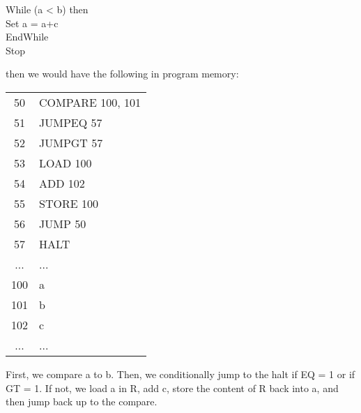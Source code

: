 \documentclass[]{article}
\begin{document}
\setlength{\parindent}{0.5cm}\noindent
While (a < b) then\\
\indent Set a = a+c\\
EndWhile\\
Stop\\
\setlength{\parindent}{0pt}

then we would have the following in program memory: \\

\begin{center}
	\begin{tabular}{c|l|}\cline{2-2}
		50 & COMPARE 100, 101 \\\cline{2-2}
		51 & JUMPEQ 57 \\\cline{2-2}
		52 & JUMPGT 57  \\\cline{2-2}
		53 & LOAD 100 \\\cline{2-2}
		54 & ADD 102 \\\cline{2-2}
		55 & STORE 100 \\\cline{2-2}
		56 & JUMP 50 \\\cline{2-2}
		57 & HALT \\\cline{2-2}
		... & ... \\\cline{2-2}
		100 & a \\\cline{2-2}
		101 & b \\\cline{2-2}
		102 & c \\\cline{2-2}
		... & ... \\\cline{2-2}
	\end{tabular}
	\bigbreak
\end{center}

First, we compare a to b. Then, we conditionally jump to the halt if EQ = 1 or if GT = 1. If not, we load a in R, add c, store the content of R back into a, and then jump back up to the compare. \\
\end{document}
